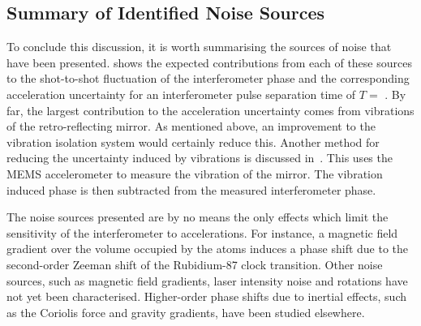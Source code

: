 \subsection{Summary of Identified Noise Sources}\label{subsec:noise_sources}
To conclude this discussion, it is worth summarising the
sources of noise that have been presented. 
 shows the expected contributions from
each of these sources to the shot-to-shot fluctuation of the
interferometer phase and the corresponding acceleration uncertainty
for an interferometer pulse separation time of $T =$
. By far, the largest
contribution to the acceleration uncertainty comes from vibrations of
the retro-reflecting mirror. As mentioned above, an improvement to the
vibration isolation system would certainly reduce this. Another method
for reducing the uncertainty induced by vibrations is discussed
in~. This uses the
MEMS accelerometer to measure the vibration of the mirror. The
vibration induced phase is then subtracted
from the measured interferometer phase.
\par\noindent
The noise sources presented are by no means the only effects which
limit the sensitivity of the interferometer to accelerations. For
instance, a magnetic field gradient over the volume occupied by the
atoms induces a phase shift due to the second-order Zeeman shift of
the Rubidium-87 clock transition. 
Other noise sources, such as magnetic field gradients, laser intensity
noise and rotations have not yet been characterised. Higher-order
phase shifts due to inertial effects, such as the Coriolis force and
gravity gradients, have been
studied elsewhere\cite{Bongs2006}.
